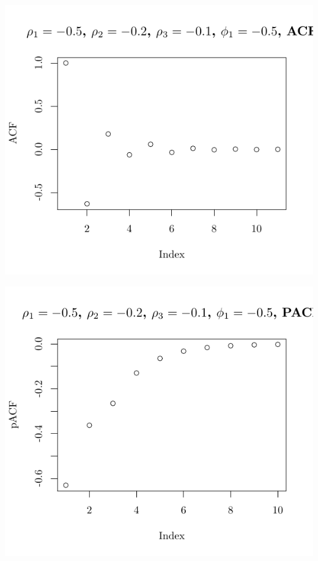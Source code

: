 \documentclass[10pt]{paper}\usepackage[]{graphicx}\usepackage[]{color}
\makeatletter
\def\maxwidth{ %
  \ifdim\Gin@nat@width>\linewidth
    \linewidth
  \else
    \Gin@nat@width
  \fi
}
\newenvironment{knitrout}{}{} %
\makeatother
\begin{document}
\begin{knitrout}
{\centering \includegraphics[width=\maxwidth]{figure/graphics-plotter-113} 

}




{\centering \includegraphics[width=\maxwidth]{figure/graphics-plotter-114} 

}





\end{knitrout}
\end{document}
